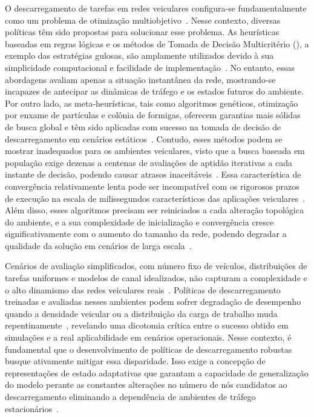 O descarregamento de tarefas em redes veiculares configura-se fundamentalmente como um problema de otimização multiobjetivo~\cite{wang2020survey,chen2025}. Nesse contexto, diversas políticas têm sido propostas para solucionar esse problema. As heurísticas baseadas em regras lógicas e os métodos de Tomada de Decisão Multicritério (), a exemplo das estratégias gulosas, são amplamente utilizados devido à sua simplicidade computacional e facilidade de implementação~\cite{ahmed2022survey}. No entanto, essas abordagens avaliam apenas a situação instantânea da rede, mostrando-se incapazes de antecipar as dinâmicas de tráfego e os estados futuros do ambiente. Por outro lado, as meta-heurísticas, tais como algoritmos genéticos, otimização por enxame de partículas e colônia de formigas, oferecem garantias mais sólidas de busca global e têm sido aplicadas com sucesso na tomada de decisão de descarregamento em cenários estáticos~\cite{li2020genetic,you2021efficient,kishor2022task}. Contudo, esses métodos podem se mostrar inadequados para os ambientes veiculares, visto que a busca baseada em população exige dezenas a centenas de avaliações de aptidão iterativas a cada instante de decisão, podendo causar atrasos inaceitáveis~\cite{wu2024,cao2024survey}. Essa característica de convergência relativamente lenta pode ser incompatível com os rigorosos prazos de execução na escala de milissegundos característicos das aplicações veiculares~\cite{miriyala2026dl_offload_review,uddin2025}. Além disso, esses algoritmos precisam ser reiniciados a cada alteração topológica do ambiente, e a sua complexidade de inicialização e convergência cresce significativamente com o aumento do tamanho da rede, podendo degradar a qualidade da solução em cenários de larga escala~\cite{wang2020survey,long2025}.

Cenários de avaliação simplificados, com número fixo de veículos, distribuições de tarefas uniformes e modelos de canal idealizados, não capturam a complexidade e o alto dinamismo das redes veiculares reais~\cite{miriyala2026dl_offload_review}. Políticas de descarregamento treinadas e avaliadas nesses ambientes podem sofrer degradação de desempenho quando a densidade veicular ou a distribuição da carga de trabalho muda repentinamente~\cite{miriyala2026dl_offload_review}, revelando uma dicotomia crítica entre o sucesso obtido em simulações e a real aplicabilidade em cenários operacionais. Nesse contexto, é fundamental que o desenvolvimento de políticas de descarregamento robustas busque ativamente mitigar essa disparidade. Isso exige a concepção de representações de estado adaptativas que garantam a capacidade de generalização do modelo perante as constantes alterações no número de nós candidatos ao descarregamento  eliminando a dependência de ambientes de tráfego estacionários~\cite{shao2025,uddin2025}.

